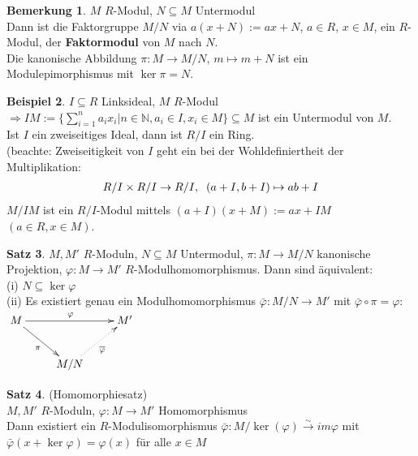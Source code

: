 \documentclass[10pt,a4paper,numbers=endperiod]{scrreprt}
\theoremstyle{definition}
\newtheorem{satz}{Satz}[section]
\newtheorem{bem}[satz]{Bemerkung}
\newtheorem{bsp}[satz]{Beispiel}
\def\NN{{\mathbb N}}
\begin{document}
\begin{bem}
	$M$ $R$-Modul, $N \subseteq M$ Untermodul\\
	Dann ist die Faktorgruppe $M/N$ via $a(x+N) := ax + N$, $a \in R$, $x \in M$, ein $R$-Modul, der \textbf{Faktormodul} von $M$ nach $N$.\\
	Die kanonische Abbildung $\pi: M \rightarrow M/N$, $m \mapsto m+N$ ist ein Modulepimorphismus mit $\ker \pi = N$.
\end{bem}

\begin{bsp}
	$I \subseteq R$ Linksideal, $M$ $R$-Modul\\
	$\Rightarrow IM := \{ \sum\limits_{i = 1}^n a_ix_i | n \in \NN, a_i \in I, x_i \in M\} \subseteq M$ ist ein Untermodul von $M$.\\
	Ist $I$ ein zweiseitiges Ideal, dann ist $R/I$ ein Ring.\\
	(beachte: Zweiseitigkeit von $I$ geht ein bei der Wohldefiniertheit der Multiplikation:
	\begin{align*}
		R/I \times R/I \to R/I, \hspace{2mm} (a + I, b+ I) \mapsto ab+I
	\end{align*}
	$M/IM$ ist ein $R/I$-Modul mittels $(a+I)(x+M) := ax+IM$ $(a \in R, x \in M)$.
\end{bsp}

\begin{satz}
	$M, M'$ $R$-Moduln, $N \subseteq M$ Untermodul, $\pi: M \rightarrow M/N$ kanonische Projektion, $\varphi: M \rightarrow M'$ $R$-Modulhomomorphismus. Dann sind äquivalent:\\
	(i) $N \subseteq \ker \varphi$\\
	(ii) Es existiert genau ein Modulhomomorphismus $\bar{\varphi}: M/N \to M'$ mit $\bar{\varphi} \circ \pi = \varphi$:\\
	$\begin{xy}
	\xymatrix{
		M \ar[rr]^{\varphi} \ar[dr]_\pi &     &  M' \\
		& M/N \ar@{.>}[ur]_{\overline{\varphi}}  
	}
	\end{xy}$
\end{satz}

\begin{satz}
	(Homomorphiesatz)\\
	$M, M'$ $R$-Moduln, $\varphi: M \rightarrow M'$ Homomorphismus\\
	Dann existiert ein $R$-Modulisomorphismus $\bar{\varphi}: M/\ker(\varphi) \overset{\sim}{\rightarrow} im \varphi$ mit $\bar{\varphi}(x + \ker \varphi) = \varphi(x)$ für alle $x \in M$
\end{satz}
\end{document}
